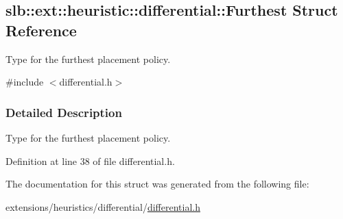 \hypertarget{structslb_1_1ext_1_1heuristic_1_1differential_1_1Furthest}{}\subsection{slb\+:\+:ext\+:\+:heuristic\+:\+:differential\+:\+:Furthest Struct Reference}
\label{structslb_1_1ext_1_1heuristic_1_1differential_1_1Furthest}


Type for the furthest placement policy.  




{\ttfamily \#include $<$differential.\+h$>$}



\subsubsection{Detailed Description}
Type for the furthest placement policy. 

Definition at line 38 of file differential.\+h.



The documentation for this struct was generated from the following file\+:\begin{DoxyCompactItemize}
\item 
extensions/heuristics/differential/\hyperlink{differential_8h}{differential.\+h}\end{DoxyCompactItemize}
